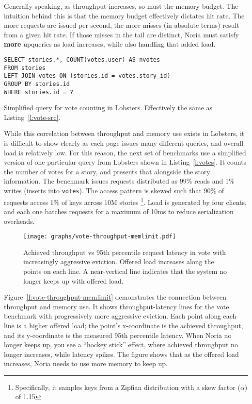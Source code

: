 Generally speaking, as throughput increases, so must the memory budget. The
intuition behind this is that the memory budget effectively dictates hit rate.
The more requests are issued per second, the more misses (in absolute terms)
result from a given hit rate. If those misses in the tail are distinct, Noria
must satisfy \textbf{more} upqueries as load increases, while also handling that
added load.

\begin{listing}[h]
  \begin{verbatim}
SELECT stories.*, COUNT(votes.user) AS nvotes
FROM stories
LEFT JOIN votes ON (stories.id = votes.story_id)
GROUP BY stories.id
WHERE stories.id = ?
  \end{verbatim}
  \caption{Simplified query for vote counting in Lobsters. Effectively the same
  as Listing~\vref{l:vote-src}.}
  \label{l:votes}
\end{listing}

While this correlation between throughput and memory use exists in Lobsters, it
is difficult to show clearly as each page issues many different queries, and
overall load is relatively low. For this reason, the next set of benchmarks use
a simplified version of one particular query from Lobsters shown in
Listing~\vref{l:votes}. It counts the number of votes for a story, and presents
that alongside the story information. The benchmark issues requests distributed
as 99\% reads and 1\% writes (inserts into \texttt{votes}). The access pattern
is skewed such that 90\% of requests access 1\% of keys across 10M stories%
\footnote{Specifically, it samples keys from a Zipfian distribution with a skew
factor ($\alpha$) of 1.15}. Load is generated by four clients, and each one
batches requests for a maximum of 10ms to reduce serialization overheads.

\begin{figure}[h]
  \centering
  \texttt{[image: graphs/vote-throughput-memlimit.pdf]}
  \caption{Achieved throughput vs 95th percentile request latency in vote with
  increasingly aggressive eviction. Offered load increases along the points on
  each line. A near-vertical line indicates that the system no longer keeps up
  with offered load.}
  \label{f:vote-throughput-memlimit}
\end{figure}

Figure~\vref{f:vote-throughput-memlimit} demonstrates the connection between
throughput and memory use. It shows throughput-latency lines for the vote
benchmark with progressively more aggressive eviction. Each point along each
line is a higher offered load; the point's x-coordinate is the achieved
throughput, and its y-coordinate is the measured 95th percentile latency. When
Noria no longer keeps up, you see a ``hockey stick'' effect, where achieved
throughput no longer increases, while latency spikes. The figure shows that as
the offered load increases, Noria needs to use more memory to keep up.

